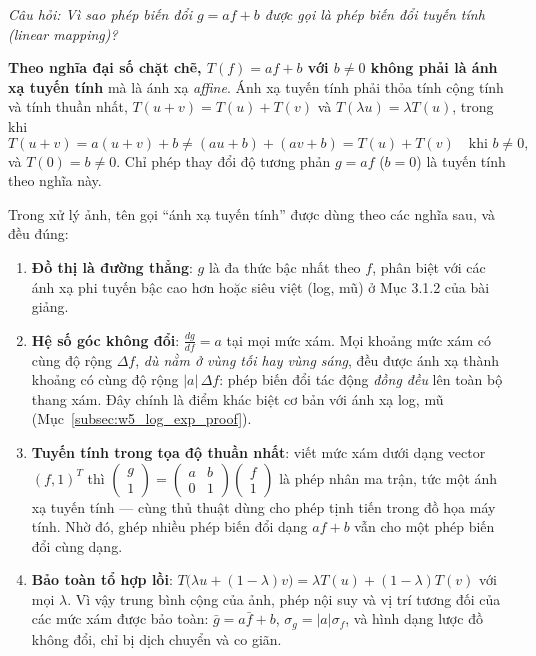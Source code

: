 \textit{Câu hỏi: Vì sao phép biến đổi $g = a f + b$ được gọi là phép biến đổi tuyến tính (linear mapping)?}

\textbf{Theo nghĩa đại số chặt chẽ, $T(f) = a f + b$ với $b \ne 0$ không phải là ánh xạ tuyến tính} mà là ánh xạ \emph{affine}. Ánh xạ tuyến tính phải thỏa tính cộng tính và tính thuần nhất, $T(u + v) = T(u) + T(v)$ và $T(\lambda u) = \lambda T(u)$, trong khi
\begin{equation}
T(u + v) = a(u + v) + b \ne (a u + b) + (a v + b) = T(u) + T(v) \quad \text{khi } b \ne 0,
\end{equation}
và $T(0) = b \ne 0$. Chỉ phép thay đổi độ tương phản $g = a f$ ($b = 0$) là tuyến tính theo nghĩa này.

Trong xử lý ảnh, tên gọi ``ánh xạ tuyến tính'' được dùng theo các nghĩa sau, và đều đúng:
\begin{enumerate}
    \item \textbf{Đồ thị là đường thẳng}: $g$ là đa thức bậc nhất theo $f$, phân biệt với các ánh xạ phi tuyến bậc cao hơn hoặc siêu việt (log, mũ) ở Mục 3.1.2 của bài giảng.
    \item \textbf{Hệ số góc không đổi}: $\frac{dg}{df} = a$ tại mọi mức xám. Mọi khoảng mức xám có cùng độ rộng $\Delta f$, \emph{dù nằm ở vùng tối hay vùng sáng}, đều được ánh xạ thành khoảng có cùng độ rộng $|a|\,\Delta f$: phép biến đổi tác động \emph{đồng đều} lên toàn bộ thang xám. Đây chính là điểm khác biệt cơ bản với ánh xạ log, mũ (Mục~\ref{subsec:w5_log_exp_proof}).
    \item \textbf{Tuyến tính trong tọa độ thuần nhất}: viết mức xám dưới dạng vector $(f, 1)^T$ thì
    $\begin{pmatrix} g \\ 1 \end{pmatrix} = \begin{pmatrix} a & b \\ 0 & 1 \end{pmatrix}\begin{pmatrix} f \\ 1 \end{pmatrix}$
    là phép nhân ma trận, tức một ánh xạ tuyến tính — cùng thủ thuật dùng cho phép tịnh tiến trong đồ họa máy tính. Nhờ đó, ghép nhiều phép biến đổi dạng $a f + b$ vẫn cho một phép biến đổi cùng dạng.
    \item \textbf{Bảo toàn tổ hợp lồi}: $T\big(\lambda u + (1 - \lambda) v\big) = \lambda T(u) + (1 - \lambda) T(v)$ với mọi $\lambda$. Vì vậy trung bình cộng của ảnh, phép nội suy và vị trí tương đối của các mức xám được bảo toàn: $\bar g = a \bar f + b$, $\sigma_g = |a|\sigma_f$, và hình dạng lược đồ không đổi, chỉ bị dịch chuyển và co giãn.
\end{enumerate}

